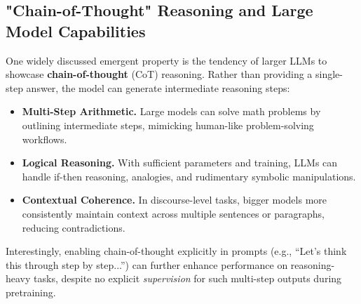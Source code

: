 \subsection{"Chain-of-Thought" Reasoning and Large Model Capabilities}
\noindent
One widely discussed emergent property is the tendency of larger LLMs to showcase \textbf{chain-of-thought} (CoT) reasoning. Rather than providing a single-step answer, the model can generate intermediate reasoning steps:
\begin{itemize}
    \item \textbf{Multi-Step Arithmetic.} Large models can solve math problems by outlining intermediate steps, mimicking human-like problem-solving workflows.
    \item \textbf{Logical Reasoning.} With sufficient parameters and training, LLMs can handle if-then reasoning, analogies, and rudimentary symbolic manipulations.
    \item \textbf{Contextual Coherence.} In discourse-level tasks, bigger models more consistently maintain context across multiple sentences or paragraphs, reducing contradictions.
\end{itemize}
Interestingly, enabling chain-of-thought explicitly in prompts (e.g., “Let’s think this through step by step...”) can further enhance performance on reasoning-heavy tasks, despite no explicit \emph{supervision} for such multi-step outputs during pretraining.

